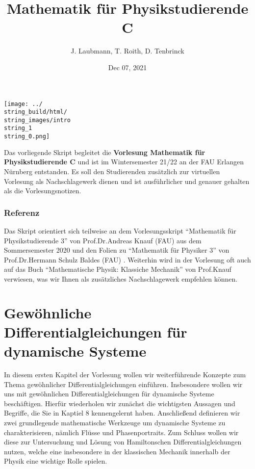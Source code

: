 \documentclass[letterpaper,10pt,english]{jupyterBook}
\title{Mathematik für Physikstudierende C}
\date{Dec 07, 2021}
\author{J.\@{} Laubmann, T.\@{} Roith, D.\@{} Tenbrinck}
\begin{document}
\label{\detokenize{intro::doc}}


\noindent\texttt{[image: ../\\string\_build/html/\\string\_images/intro\\string\_1\\string\_0.png]}

\par
Das vorliegende Skript begleitet die \textbf{Vorlesung Mathematik für Physikstudierende C} und ist im Wintersemester 21/22 an der FAU Erlangen Nürnberg entstanden. Es soll den Studierenden zusätzlich zur virtuellen Vorlesung als Nachschlagewerk dienen und ist ausführlicher und genauer gehalten als die Vorlesungsnotizen.

\subsection{Referenz}

\par
Das Skript orientiert sich teilweise an dem Vorlesungsskript “Mathematik für Physikstudierende 3” \cite{Kna20} von Prof.Dr.Andreas Knauf (FAU) aus dem Sommersemester 2020 und den Folien zu “Mathematik für Physiker 3” von Prof.Dr.Hermann Schulz Baldes (FAU) \cite{SB18}. Weiterhin wird in der Vorlesung oft auch auf das Buch “Mathematische Physik: Klassiche Mechanik” \cite{Kna17} von Prof.Knauf verwiesen, was wir Ihnen als zusätzliches Nachschlagewerk empfehlen können.


\chapter{Gewöhnliche Differentialgleichungen für dynamische Systeme}
\label{\detokenize{ode/ode:gewohnliche-differentialgleichungen-fur-dynamische-systeme}}\label{\detokenize{ode/ode::doc}}
\par
In diesem ersten Kapitel der Vorlesung wollen wir weiterführende Konzepte zum Thema gewöhnlicher Differentialgleichungen einführen.
Insbesondere wollen wir uns mit gewöhnlichen Differentialgleichungen für dynamische Systeme beschäftigen.
Hierfür wiederholen wir zunächst die wichtigsten Aussagen und Begriffe, die Sie in Kaptiel 8 \cite{Ten21} kennengelernt haben.
Anschließend definieren wir zwei grundlegende mathematische Werkzeuge um dynamische Systeme zu charakterisieren, nämlich Flüsse und Phasenportraits.
Zum Schluss wollen wir diese zur Untersuchung und Lösung von Hamiltonschen Differentialgleichungen nutzen, welche eine insbesondere in der klassischen Mechanik innerhalb der Physik eine wichtige Rolle spielen.
\end{document}
